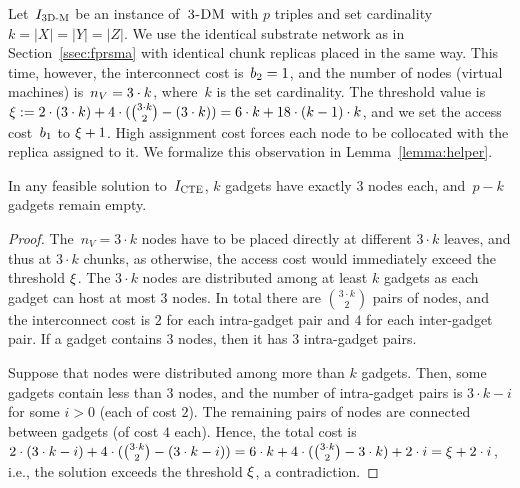 Let~$I_{\mathrm{\textsc{3D-M}}}$ be an instance of~$\textsc{3-DM}$ with $p$ triples and set cardinality $k = |X| = |Y| = |Z|$.
We use the identical substrate network as in Section~\ref{ssec:fprsma} with
identical chunk replicas placed in the same way.
This time, however, the interconnect cost is~$b_2 = 1$, and the number of nodes (virtual machines) is~$n_V = 3 \cdot k$, where~$k$ is the set cardinality.
The threshold value is $\xi :=  2\cdot (3\cdot k) + 4\cdot({ 3\cdot k \choose 2} - (3\cdot k)) = 6\cdot k + 18\cdot (k-1)\cdot k$, and we set the access cost~$b_1$ to $\xi + 1$.
High assignment cost forces each node to be collocated with the replica assigned to it.
We formalize this observation in Lemma~\ref{lemma:helper}.
\begin{lemma}\label{lemma:helper}
In any feasible solution to~$I_{\mathrm{\textsc{CTE}}}$, $k$ gadgets have exactly
$3$ nodes each, and~$p-k$ gadgets remain empty.
\end{lemma}
\begin{proof}
The~$n_V = 3\cdot k$ nodes have to be placed
directly at different $3\cdot k$ leaves, and thus at $3\cdot k$ chunks, as otherwise, the access cost would immediately exceed the threshold $\xi$.
The $3\cdot k$ nodes are distributed among at least $k$ gadgets as each gadget can host at most $3$ nodes.
In total there are ${3\cdot k \choose 2}$ pairs of nodes,
and the interconnect cost is $2$ for each intra-gadget pair and $4$ for each inter-gadget pair.
If a gadget contains $3$ nodes, then it has $3$ intra-gadget pairs.

Suppose that nodes were distributed among more than $k$ gadgets.
Then, some gadgets contain less than $3$ nodes, and the number of intra-gadget pairs is $3\cdot k - i$ for some $i>0$ (each of cost $2$).
The remaining pairs of nodes are connected between gadgets (of cost $4$ each).
Hence, the total cost is $2\cdot (3\cdot k - i) + 4 \cdot ({3 \cdot k \choose 2} - (3\cdot k - i)) = 6\cdot k + 4 \cdot ({3 \cdot k \choose 2} - 3\cdot k) + 2\cdot i = \xi + 2\cdot i$, i.e., the solution exceeds the threshold $\xi$, a contradiction.
\end{proof}

